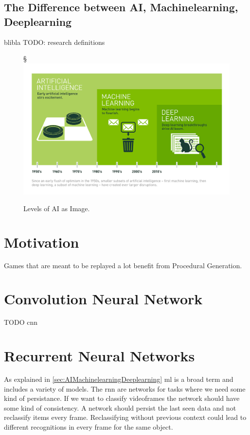 \documentclass[10pt,a4paper]{article}
\begin{document}
\subsection{The Difference between AI, Machinelearning, Deeplearning}
\label{sec:AIMachinelearningDeeplearning}
blibla \cite{MichaelCopeland2016} TODO: research definitions
\begin{figure}[H]§
	\includegraphics[width=\textwidth, height=\textheight, keepaspectratio]{Deep_Learning_Icons_R5.png}
	\caption{Levels of AI as Image\cite{MichaelCopeland2016}.}
\end{figure}

\section{Motivation}
Games that are meant to be replayed a lot benefit from Procedural Generation.

\section{Convolution Neural Network}
TODO \gls{cnn}

\section{Recurrent Neural Networks}
As explained in \autoref{sec:AIMachinelearningDeeplearning} \gls{ml} is a broad term and includes a variety of models. The \gls{rnn} are networks for tasks where we need some kind of persistance. If we want to classify videoframes the network should have some kind of consistency.\cite{Olah2015} A network should persist the last seen data and not reclassify items every frame. Reclassifying without previous context could lead to different recognitions in every frame for the same object.
\end{document}
